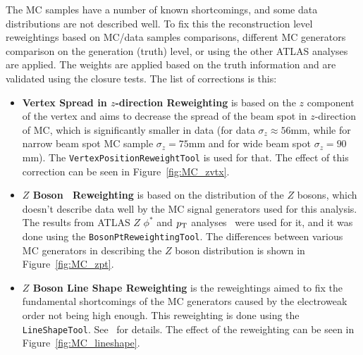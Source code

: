 The MC samples have a number of known shortcomings, and some data distributions are not described well. To fix this the reconstruction level reweightings based on MC/data samples comparisons, different MC generators comparison on the generation (truth) level, or using the other ATLAS analyses are applied. The weights are applied based on the truth information and are validated using the closure tests. The list of corrections is this:

\begin{itemize}
\item \textbf{Vertex Spread in $z$-direction Reweighting} is based on the $z$ component of the vertex and aims to decrease the spread of the beam spot in $z$-direction of MC, which is significantly smaller in data (for data $\sigma_z \approx 56$mm, while for narrow beam spot MC sample $\sigma_z = 75$mm and for wide beam spot $\sigma_z = 90$mm). The \texttt{VertexPositionReweightTool} is used for that. The effect of this correction can be seen in Figure~\ref{fig:MC_zvtx}.
\item \textbf{$Z$ Boson \pt\ Reweighting} is based on the \pt distribution of the $Z$ bosons, which doesn't describe data well by the MC signal generators used for this analysis. The results from ATLAS $Z$ $\phi^*$ and $p_{\mathrm{T}}$ analyses~\cite{lib:Zphistar} were used for it, and it was done using the \texttt{BosonPtReweightingTool}. The differences between various MC generators in describing the $Z$ boson \pt distribution is shown in Figure~\ref{fig:MC_zpt}.
\item \textbf{$Z$ Boson Line Shape Reweighting} is the reweightings aimed to fix the fundamental shortcomings of the MC generators caused by the electroweak order not being high enough. This reweighting is done using the \texttt{LineShapeTool}. See~\cite{lib:lineshape} for details. The effect of the reweighting can be seen in Figure~\ref{fig:MC_lineshape}.
\end{itemize}

